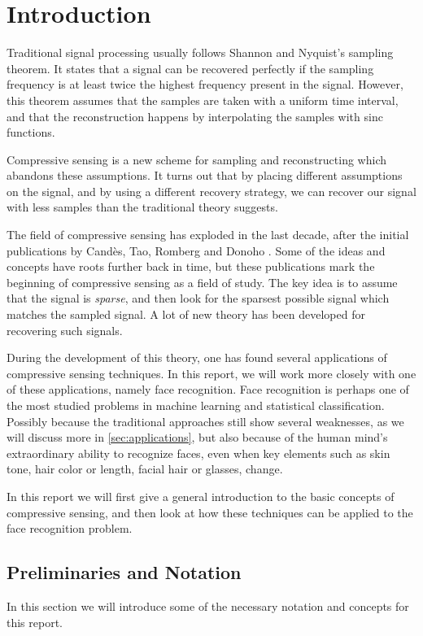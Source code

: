\chapter{Introduction}
Traditional signal processing usually follows Shannon and Nyquist's sampling theorem. It states that a signal can be recovered perfectly if the sampling frequency is at least twice the highest frequency present in the signal.  However, this theorem assumes that the samples are taken with a uniform time interval, and that the reconstruction happens by interpolating the samples with sinc functions. 

Compressive sensing is a new scheme for sampling and reconstructing which abandons these assumptions. It turns out that by placing different assumptions on the signal, and by using a different recovery strategy, we can recover our signal with less samples than the traditional theory suggests. 

The field of compressive sensing has exploded in the last decade, after the initial publications by Cand{\`e}s, Tao, Romberg and Donoho \cite{candes2006near, candes2006robust, donoho2006compressed}. Some of the ideas and concepts have roots further back in time, but these publications mark the beginning of compressive sensing as a field of study. The key idea is to assume that the signal is \textit{sparse}, and then look for the sparsest possible signal which matches the sampled signal. A lot of new theory has been developed for recovering such signals. 

During the development of this theory, one has found several applications of compressive sensing techniques. In this report, we will work more closely with one of these applications, namely face recognition. Face recognition is perhaps one of the most studied problems in machine learning and statistical classification. Possibly because the traditional approaches still show several weaknesses, as we will discuss more in \cref{sec:applications}, but also because of the human mind's extraordinary ability to recognize faces, even when key elements such as skin tone, hair color or length, facial hair or glasses, change. 

In this report we will first give a general introduction to the basic concepts of compressive sensing, and then look at how these techniques can be applied to the face recognition problem. 


\section{Preliminaries and Notation}
In this section we will introduce some of the necessary notation and concepts for this report. 

